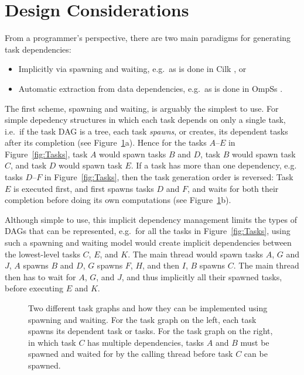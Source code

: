 \documentclass[preprint]{elsarticle}
\newcommand{\fig}[1]
    {Figure~\ref{fig:#1}}
\begin{document}
\section{Design Considerations}

From a programmer's perspective, there are two main paradigms for generating
task dependencies:
\begin{itemize}
  \item Implicitly via spawning and waiting, e.g.~as is done in Cilk
    \cite{ref:Blumofe1995}, or
  \item Automatic extraction from data dependencies, e.g.~as is done in OmpSs
    \cite{ref:Duran2011}.
\end{itemize}

The first scheme, spawning and waiting, is arguably the simplest to
use.
For simple depedency structures in which each task depends on only a
single task, i.e.~if the task DAG is a tree, each task {\em spawns}, or
creates, its dependent tasks after its completion (see \fig{Spawn}a).
Hence for the tasks $A$--$E$ in \fig{Tasks}, task $A$ would spawn
tasks $B$ and $D$, task $B$ would spawn task $C$, and task $D$ would
spawn task $E$.
If a task has more than one dependency, e.g. tasks $D$--$F$ in \fig{Tasks},
then the task generation order is reversed: Task $E$ is executed first,
and first spawns tasks $D$ and $F$, and waits for both their completion
before doing its own computations (see \fig{Spawn}b).

Although simple to use, this implicit dependency management
limits the types of DAGs that can be represented, e.g.~for
all the tasks in \fig{Tasks}, using such a spawning and waiting model
would create implicit dependencies between the lowest-level
tasks $C$, $E$, and $K$.
The main thread would spawn tasks $A$, $G$ and $J$, $A$ spawns $B$ and $D$,
$G$ spawns $F$, $H$, and then $I$, $B$ spawns $C$.
The main thread then has to wait for $A$, $G$, and $J$,
and thus implicitly all their spawned tasks, before executing
$E$ and $K$.

\begin{figure}
    \centerline{}
    \caption{Two different task graphs and how they can be implemented
      using spawning and waiting.
      For the task graph on the left, each task spawns its dependent
      task or tasks. For the task graph on the right, in which task $C$
      has multiple dependencies, tasks $A$ and $B$ must be spawned and waited
      for by the calling thread before task $C$ can be spawned.}
    \label{fig:Spawn}
\end{figure}
\end{document}
